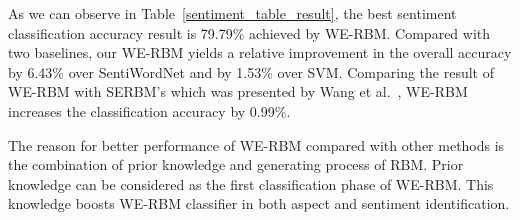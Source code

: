 As we can observe in Table~\ref{sentiment_table_result}, the best sentiment classification accuracy result is 79.79\% achieved by WE-RBM.
Compared with two baselines, our WE-RBM yields a relative improvement in the overall accuracy by 6.43\% over SentiWordNet and by 1.53\% over SVM.
Comparing the result of WE-RBM with SERBM's which was presented by Wang et al.~\cite{serbm}, WE-RBM increases the classification accuracy by 0.99\%. 

The reason for better performance of WE-RBM compared with other methods is the combination of prior knowledge and generating process of RBM.
Prior knowledge can be considered as the first classification phase of WE-RBM.
This knowledge boosts WE-RBM classifier in both aspect and sentiment identification.